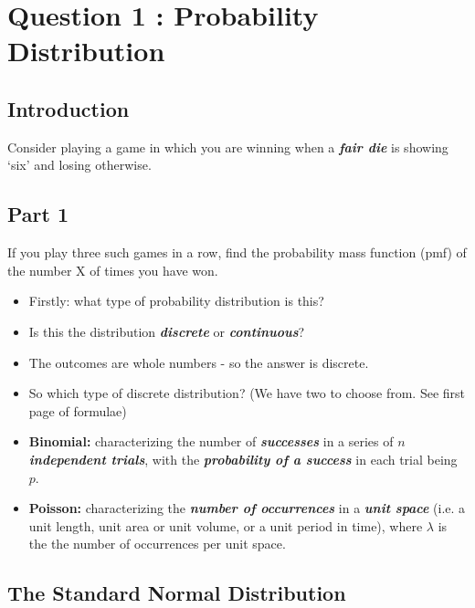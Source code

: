 \section*{Question 1 : Probability Distribution}

\subsection*{Introduction}{\LARGE Consider playing a game in which you are winning when a \textbf{\emph{fair die}} is showing `six'
	and losing otherwise.}
\subsection*{Part 1}{\LARGE If you play three such games in a row, find the probability mass function (pmf) of the number
	X of times you have won.}

{\LARGE
	\begin{itemize}
		\item Firstly: what type of probability distribution is this?
		
		\item Is this the distribution \textbf{\emph{discrete}} or  \textbf{\emph{continuous}}?
		
		\item The outcomes are whole numbers - so the answer is discrete.
		
		\item So which type of discrete distribution? (We have two to choose from. See first page of formulae)
		
		
		\item \textbf{Binomial:} characterizing the number of \textbf{\emph{successes}} in a series of \textbf{\emph{$n$ independent trials}}, with the \textbf{\emph{probability of a success}} in each trial being $p$.
		
		\item \textbf{Poisson:}  characterizing the \textbf{\emph{number of occurrences}} in a \textbf{\emph{unit space}} (i.e. a unit length, unit area or unit volume, or a unit period in time), where $\lambda$ is the the number of occurrences per unit space.
		
	\end{itemize}
}

\subsection{The Standard Normal Distribution}



